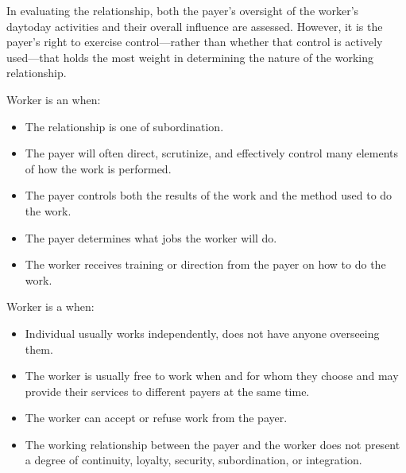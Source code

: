 \documentclass[letterpaper,10pt,english]{sphinxmanual}
\begin{document}
\sphinxAtStartPar
In evaluating the relationship, both the payer’s oversight of the worker’s day\sphinxhyphen{}to\sphinxhyphen{}day activities and their overall
influence are assessed. However, it is the payer’s right to exercise control—rather than whether that control is actively
used—that holds the most weight in determining the nature of the working relationship.

\sphinxAtStartPar
Worker is an  when:
\begin{itemize}
\item {} 
\sphinxAtStartPar
The relationship is one of subordination.

\item {} 
\sphinxAtStartPar
The payer will often direct, scrutinize, and effectively control many elements of how the work is performed.

\item {} 
\sphinxAtStartPar
The payer controls both the results of the work and the method used to do the work.

\item {} 
\sphinxAtStartPar
The payer determines what jobs the worker will do.

\item {} 
\sphinxAtStartPar
The worker receives training or direction from the payer on how to do the work.

\end{itemize}

\sphinxAtStartPar
Worker is a  when:
\begin{itemize}
\item {} 
\sphinxAtStartPar
Individual usually works independently, does not have anyone overseeing them.

\item {} 
\sphinxAtStartPar
The worker is usually free to work when and for whom they choose and may provide their services to different payers at the same time.

\item {} 
\sphinxAtStartPar
The worker can accept or refuse work from the payer.

\item {} 
\sphinxAtStartPar
The working relationship between the payer and the worker does not present a degree of continuity, loyalty, security, subordination, or integration.

\end{itemize}
\end{document}

